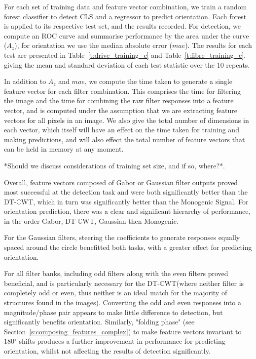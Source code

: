 \documentclass{IEEEtran}
\newcommand{\tref}[1]{Table~\ref{#1}}
\newcommand{\sref}[1]{Section~\ref{#1}}
\def\dtcwt{DT-$\mathbb{C}$WT}
\def\deg{\ensuremath{^\circ}}
\begin{document}
For each set of training data and feature vector combination, we train a random forest classifier to detect CLS and a regressor to predict orientation. Each forest is applied to its respective test set, and the results recorded. For detection, we compute an ROC curve and summarise performance by the area under the curve ($A_z$), for orientation we use the median absolute error ($mae$). The results for each test are presented in \tref{t:drive_training_c} and \tref{t:fibre_training_c}, giving the mean and standard deviation of each test statistic over the 10 repeats.

In addition to $A_z$ and $mae$, we compute the time taken to generate a single feature vector for each filter combination. This comprises the time for filtering the image and the time for combining the raw filter responses into a feature vector, and is computed under the assumption that we are extracting feature vectors for all pixels in an image. We also give the total number of dimensions in each vector, which itself will have an effect on the time taken for training and making predictions, and will also effect the total number of feature vectors that can be held in memory at any moment.

*Should we discuss considerations of training set size, and if so, where?*.

Overall, feature vectors composed of Gabor or Gaussian filter outputs proved most successful at the detection task and were both significantly better than the \dtcwt, which in turn was significantly better than the Monogenic Signal. For orientation prediction, there was a clear and significant hierarchy of performance, in the order Gabor, \dtcwt, Gaussian then Monogenic.

For the Gaussian filters, steering the coefficients to generate responses equally spaced around the circle benefitted both tasks, with a greater effect for predicting orientation.

For all filter banks, including odd filters along with the even filters proved beneficial, and is particularly necessary for the \dtcwt (where neither filter is completely odd or even, thus neither is an ideal match for the majority of structures found in the images). Converting the odd and even responses into a magnitude/phase pair appears to make little difference to detection, but significantly benefits orientation. Similarly, "folding phase" (see \sref{s:composing_features_complex}) to make feature vectors invariant to $180\deg$ shifts produces a further improvement in performance for predicting orientation, whilst not affecting the results of detection significantly.
\end{document}
